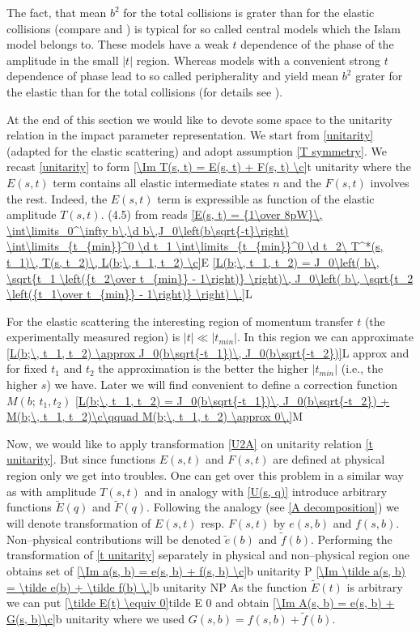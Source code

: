 The fact, that mean $b^2$ for the total collisions is grater than for the elastic collisions (compare \fgs{}  and ) is typical for so called central models which the Islam model belongs to. These models have a weak $t$ dependence of the phase of the amplitude in the small $|t|$ region. Whereas models with a convenient strong $t$ dependence of phase lead to so called peripherality and yield mean $b^2$ grater for the elastic than for the total collisions (for details see \rf{} ).

At the end of this section we would like to devote some space to the unitarity relation in the impact parameter representation. We start from \equ{} \ref{unitarity} (adapted for the elastic scattering) and adopt assumption \ref{T symmetry}. We recast \equ{} \ref{unitarity} to form
\eqref{\Im T(s, t) = E(s, t) + F(s, t) \c}{t unitarity}
where the $E(s, t)$ term contains all elastic intermediate states $n$ and the $F(s, t)$ involves the rest. Indeed, the $E(s, t)$ term is expressible as function of the elastic amplitude $T(s, t)$. \Equ{} (4.5) from  reads
\eqref{E(s, t) = {1\over 8pW}\, \int\limits_0^\infty b\,\d b\,J_0\left(b\sqrt{-t}\right) \int\limits_{t_{min}}^0 \d t_1 \int\limits_{t_{min}}^0 \d t_2\ T^*(s, t_1)\, T(s, t_2)\, L(b;\, t_1, t_2) \c}{E}
\eqref{L(b;\, t_1, t_2) = J_0\left( b\, \sqrt{t_1 \left({t_2\over t_{min}} - 1\right)} \right)\, J_0\left( b\, \sqrt{t_2 \left({t_1\over t_{min}} - 1\right)} \right) \.}{L}

For the elastic scattering the interesting region of momentum transfer $t$ (the experimentally measured region) is $|t| \ll |t_{min}|$. In this region we can approximate
\eqref{L(b;\, t_1, t_2) \approx J_0(b\sqrt{-t_1})\, J_0(b\sqrt{-t_2})}{L approx}
and for fixed $t_1$ and $t_2$ the approximation is the better the higher $|t_{min}|$ (i.e., the higher $s$) we have. Later we will find convenient to define a correction function $M(b;\, t_1, t_2)$
\eqref{L(b;\, t_1, t_2) = J_0(b\sqrt{-t_1})\, J_0(b\sqrt{-t_2}) + M(b;\, t_1, t_2)\c\qquad M(b;\, t_1, t_2) \approx 0\.}{M}

Now, we would like to apply transformation \ref{U2A} on unitarity relation \ref{t unitarity}. But since functions $E(s, t)$ and $F(s, t)$ are defined at physical region only we get into troubles. One can get over this problem in a similar way as with amplitude $T(s, t)$ and in analogy with \ref{U(s, q)} introduce arbitrary functions $\tilde E(q)$ and $\tilde F(q)$. Following the analogy (see \equ{} \ref{A decomposition}) we will denote transformation of $E(s, t)$ resp. $F(s, t)$ by $e(s, b)$ and $f(s, b)$. Non--physical contributions will be denoted $\tilde e(b)$ and $\tilde f(b)$. Performing the transformation of \ref{t unitarity} separately in physical and non--physical region one obtains set of \equs{}
\eqref{\Im a(s, b) = e(s, b) + f(s, b) \c}{b unitarity P}
\eqref{\Im \tilde a(s, b) = \tilde e(b) + \tilde f(b) \.}{b unitarity NP}
As the function $\tilde E(t)$ is arbitrary we can put 
\eqref{\tilde E(t) \equiv 0}{tilde E 0}
and obtain
\eqref{\Im A(s, b) = e(s, b) + G(s, b)\c}{b unitarity}
where we used $G(s, b) = f(s, b) + \tilde f(b)$.


